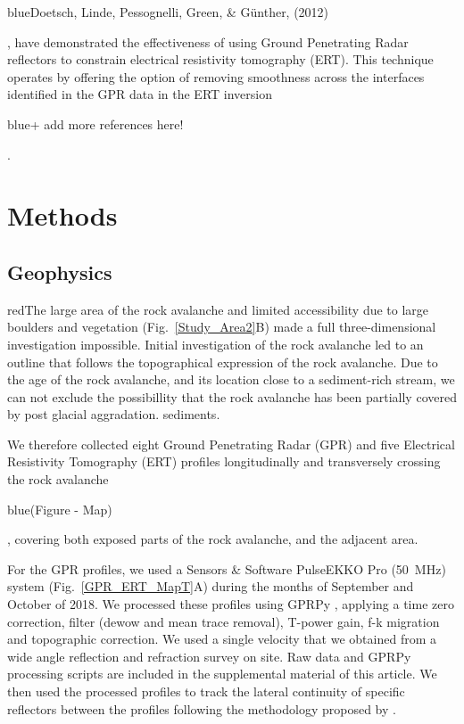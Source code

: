 \documentclass[5p]{elsarticle}
\newcommand{\COMON}{\begin{color}{blue}}
\newcommand{\COMOFF}{\end{color}}
\newcommand{\alon}{\begin{color}{red}}
\newcommand{\aloff}{\end{color}}
\begin{document}
\COMON Doetsch, Linde, Pessognelli, Green, \& G\"unther, (2012)\COMOFF, have demonstrated the effectiveness of using Ground Penetrating Radar reflectors to constrain electrical resistivity tomography (ERT). This technique operates by offering the option of removing smoothness across the interfaces identified in the GPR data in the ERT inversion \COMON + add more references here! \COMOFF.  



\bigskip   



\section{Methods}

\subsection{Geophysics}

\alon The large area of the rock avalanche and limited accessibility
due to large boulders and vegetation (Fig.~\ref{Study_Area2}B) made a
full three-dimensional investigation impossible. Initial investigation
of the rock avalanche led to an outline that follows the topographical
expression of the rock avalanche. Due to the age of the rock
avalanche, and its location close to a sediment-rich stream, we can
not exclude the possibillity that the rock avalanche has been partially covered by post glacial aggradation. 
sediments. \aloff We therefore collected eight Ground Penetrating Radar
(GPR) and five Electrical Resistivity Tomography (ERT) profiles
longitudinally and transversely crossing the rock avalanche
\COMON(Figure - Map)\COMOFF, covering both exposed parts of the rock
avalanche, and the adjacent area.



For the GPR profiles, we used a Sensors \& Software PulseEKKO Pro (\SI{50}{\mega Hz}) system (Fig.~\ref{GPR_ERT_MapT}A) during the
months of September and October of 2018. We processed these profiles using GPRPy
\citep{plattner2019comunity,Plattner2019}, applying a time zero
correction, filter (dewow and mean trace removal), T-power gain, f-k
migration \citep{stolt1978migration} and topographic correction. We used a single velocity that we obtained from a wide angle
reflection and refraction survey on site. Raw data and GPRPy
processing scripts are included in the supplemental material of this
article. We then used the processed profiles to track the lateral continuity of specific reflectors between the profiles following the methodology proposed by
\citep{mitchum1977seismic}.
\end{document}
